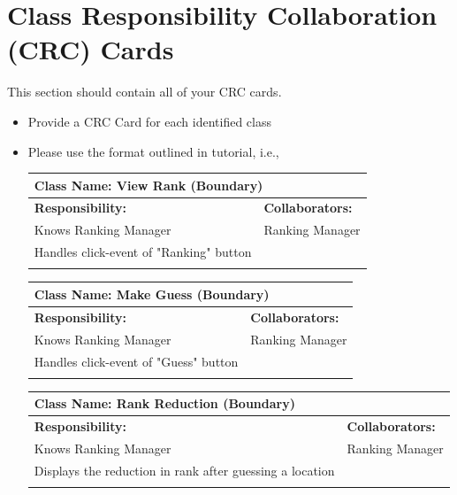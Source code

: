 \documentclass[]{article}
\begin{document}
	
\section{Class Responsibility Collaboration (CRC) Cards}
\label{sec:class_responsibility_collaboration_crc_cards}
This section should contain all of your CRC cards.

\begin{itemize}
	\item Provide a CRC Card for each identified class
	\item Please use the format outlined in tutorial, i.e.,
	\begin{table}[ht]
		\centering
		\begin{tabular}{|p{8cm}|p{8cm}|}
		\hline 
		 \multicolumn{2}{|l|}{\textbf{Class Name:} View Rank (Boundary)} \\
		\hline
		\textbf{Responsibility:} & \textbf{Collaborators:} \\
		\hline
		Knows Ranking Manager & Ranking Manager \\
		Handles click-event of "Ranking" button & \\
		\vspace{1in} & \\
		\hline
		\end{tabular}
	\end{table}

	\begin{table}
		\centering
		\begin{tabular}{|p{8cm}|p{8cm}|}
		\hline 
		 \multicolumn{2}{|l|}{\textbf{Class Name:} Make Guess (Boundary)} \\
		\hline
		\textbf{Responsibility:} & \textbf{Collaborators:} \\
		\hline
		Knows Ranking Manager & Ranking Manager \\
		Handles click-event of "Guess" button & \\
		\vspace{1in} & \\
		\hline
		\end{tabular}
	\end{table}
	
	\begin{table}
		\centering
		\begin{tabular}{|p{8cm}|p{8cm}|}
		\hline 
		 \multicolumn{2}{|l|}{\textbf{Class Name:} Rank Reduction (Boundary)} \\
		\hline
		\textbf{Responsibility:} & \textbf{Collaborators:} \\
		\hline
		Knows Ranking Manager & Ranking Manager \\
		Displays the reduction in rank after guessing a location & \\
		\vspace{1in} & \\
		\hline
		\end{tabular}
	\end{table}


\end{itemize}
\end{document}
